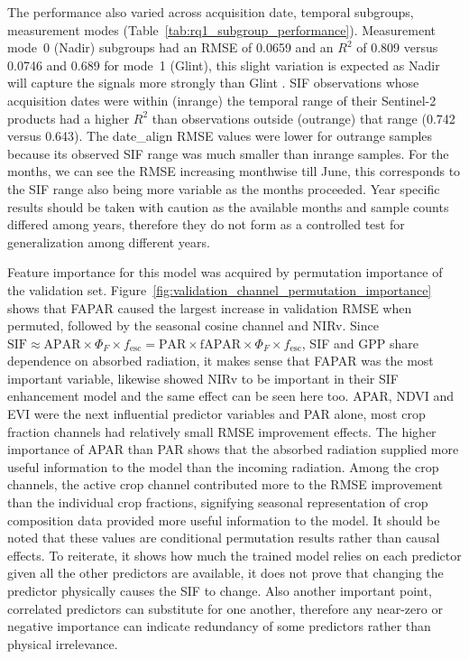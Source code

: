 The performance also varied across acquisition date, temporal subgroups, measurement modes (Table~\ref{tab:rq1_subgroup_performance}).  Measurement mode~0 (Nadir) subgroups had an RMSE of 0.0659 and an $R^2$ of 0.809 versus 0.0746 and 0.689 for mode~1 (Glint), this slight variation is expected as Nadir will capture the signals more strongly than Glint \cite{doughty2022global}. SIF observations whose acquisition dates were within (inrange) the temporal range of their Sentinel-2 products had a higher $R^2$ than observations outside (outrange) that range (0.742 versus 0.643). The date\_align RMSE values were lower for outrange samples because its observed SIF range was much smaller than inrange samples. For the months, we can see the RMSE increasing monthwise till June, this corresponds to the SIF range also being more variable as the months proceeded. Year specific results should be taken with caution as the available months and sample counts differed among years, therefore they do not form as a controlled test for generalization among different years. 

Feature importance for this model was acquired by permutation importance of the validation set. Figure~\ref{fig:validation_channel_permutation_importance} shows
that FAPAR caused the largest increase in validation RMSE when permuted, followed by the seasonal cosine channel and NIRv. Since \(\mathrm{SIF} \approx \mathrm{APAR}\times\Phi_F\times f_{\mathrm{esc}} 
= \mathrm{PAR}\times\mathrm{fAPAR}\times\Phi_F\times f_{\mathrm{esc}}\), SIF and GPP share dependence on absorbed radiation, it makes sense that FAPAR was the most important variable, likewise \cite{gensheimer2022convolutional} showed NIRv to be important in their SIF enhancement model and the same effect can be seen here too. APAR, NDVI and EVI were the next influential predictor variables and PAR alone, most crop fraction channels had relatively small RMSE improvement effects. The higher importance of APAR than PAR shows that the absorbed radiation supplied more useful information to the model than the incoming radiation. Among the crop channels, the active crop channel contributed more to the RMSE improvement than the individual crop fractions, signifying seasonal representation of crop composition data provided more useful information to the model. It should be noted that these values are conditional permutation results rather than causal effects. To reiterate, it shows how much the trained model relies on each predictor given all the other predictors are available, it does not prove that changing the predictor physically causes the SIF to change. Also another important point, correlated predictors can substitute for one another, therefore any near-zero or negative importance can indicate redundancy of some predictors rather than physical irrelevance. 

